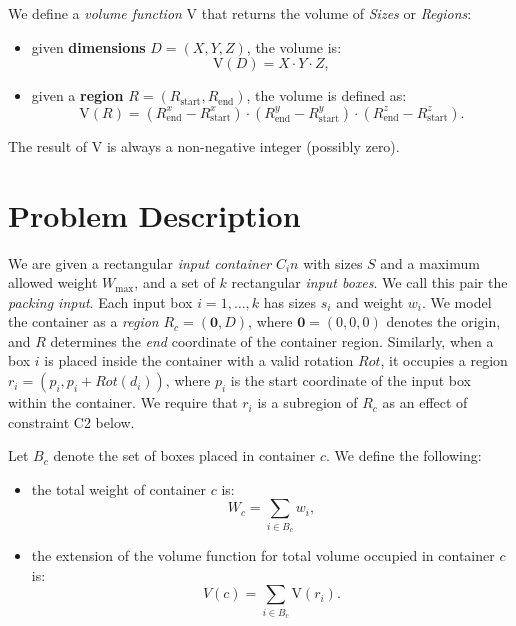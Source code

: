We define a \emph{volume function} $\mathrm{V}$ that returns the volume of \textit{Sizes} or \textit{Regions}:

\begin{itemize}
    \item given \textbf{dimensions} $D = (X, Y, Z)$, the volume is:
    \[
    \mathrm{V}(D) = X \cdot Y \cdot Z,
    \]
    
    \item given a \textbf{region} $R = (R_\text{start}, R_\text{end})$, the volume is defined as:
    \[
    \mathrm{V}(R) = (R_\text{end}^x - R_\text{start}^x) \cdot (R_\text{end}^y - R_\text{start}^y) \cdot (R_\text{end}^z - R_\text{start}^z).
    \]
\end{itemize}

The result of $\mathrm{V}$ is always a non-negative integer (possibly zero).













\section{Problem Description}



We are given a rectangular \emph{input container} $C_in$ with sizes $S$ and a maximum allowed weight $W_\text{max}$, and a set of $k$ rectangular \emph{input boxes}. We call this pair the \emph{packing input}. Each input box $i = 1, \dots, k$ has sizes $s_i$ and weight $w_i$.
We model the container as a \textit{region} $R_c = (\mathbf{0}, D)$, where $\mathbf{0} = (0, 0, 0)$ denotes the origin, and $R$ determines the \textit{end} coordinate of the container region.
Similarly, when a box $i$ is placed inside the container with a valid rotation $Rot$, it occupies a region $r_i = (p_i, p_i + Rot(d_i))$, where $p_i$ is the start coordinate of the input box within the container. We require that $r_i$ is a subregion of $R_c$ as an effect of constraint C2 below.


Let $B_c$ denote the set of boxes placed in container $c$. We define the following:


\begin{itemize}
    \item the total weight of container $c$ is:
    \[
    W_c = \sum_{i \in B_c} w_i,
    \]
    
    \item the extension of the volume function for total volume occupied in container $c$ is:
    \[
    V(c) = \sum_{i \in B_c} \mathrm{V}(r_i).
    \]
\end{itemize}






